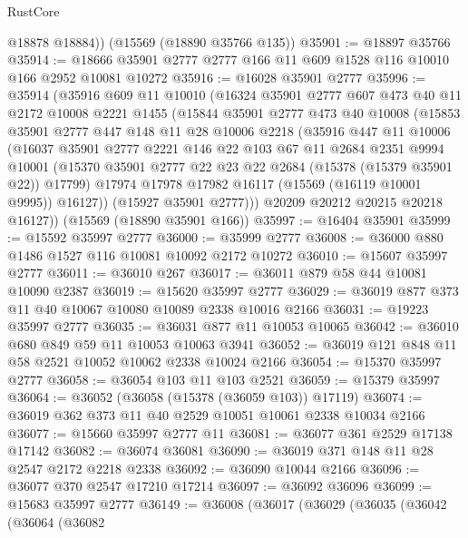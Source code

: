 \begin{lexlean}{RustCore}
\begin{coremodule}
        @18878
        @18884))
    (@15569 (@18890 @35766 @135))
@35901 := @18897 @35766
@35914 := @18666 @35901 @2777 @2777 @166 @11 @609 @1528 @116 @10010 @166 @2952 @10081 @10272
@35916 := @16028 @35901 @2777
@35996 := @35914
    (@35916
      @609
      @11
      @10010
      (@16324
        @35901
        @2777
        @607
        @473
        @40
        @11
        @2172
        @10008
        @2221
        @1455
        (@15844
          @35901
          @2777
          @473
          @40
          @10008
          (@15853
            @35901
            @2777
            @447
            @148
            @11
            @28
            @10006
            @2218
            (@35916
              @447
              @11
              @10006
              (@16037
                @35901
                @2777
                @2221
                @146
                @22
                @103
                @67
                @11
                @2684
                @2351
                @9994
                @10001
                (@15370 @35901 @2777 @22 @23 @22 @2684 (@15378 (@15379 @35901 @22)) @17799)
                @17974
                @17978
                @17982
                @16117
                (@15569 (@16119 @10001 @9995))
                @16127))
            (@15927 @35901 @2777)))
        @20209
        @20212
        @20215
        @20218
        @16127))
    (@15569 (@18890 @35901 @166))
@35997 := @16404 @35901
@35999 := @15592 @35997 @2777
@36000 := @35999 @2777
@36008 := @36000 @880 @1486 @1527 @116 @10081 @10092 @2172 @10272
@36010 := @15607 @35997 @2777
@36011 := @36010 @267
@36017 := @36011 @879 @58 @44 @10081 @10090 @2387
@36019 := @15620 @35997 @2777
@36029 := @36019 @877 @373 @11 @40 @10067 @10080 @10089 @2338 @10016 @2166
@36031 := @19223 @35997 @2777
@36035 := @36031 @877 @11 @10053 @10065
@36042 := @36010 @680 @849 @59 @11 @10053 @10063 @3941
@36052 := @36019 @121 @848 @11 @58 @2521 @10052 @10062 @2338 @10024 @2166
@36054 := @15370 @35997 @2777
@36058 := @36054 @103 @11 @103 @2521
@36059 := @15379 @35997
@36064 := @36052 (@36058 (@15378 (@36059 @103)) @17119)
@36074 := @36019 @362 @373 @11 @40 @2529 @10051 @10061 @2338 @10034 @2166
@36077 := @15660 @35997 @2777 @11
@36081 := @36077 @361 @2529 @17138 @17142
@36082 := @36074 @36081
@36090 := @36019 @371 @148 @11 @28 @2547 @2172 @2218 @2338
@36092 := @36090 @10044 @2166
@36096 := @36077 @370 @2547 @17210 @17214
@36097 := @36092 @36096
@36099 := @15683 @35997 @2777
@36149 := @36008
    (@36017
      (@36029
        (@36035
          (@36042
            (@36064
              (@36082

\end{coremodule}
\end{lexlean}
